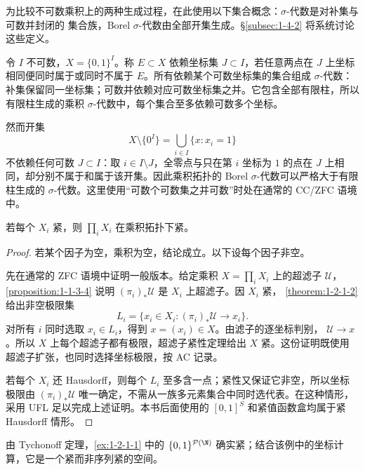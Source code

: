 \begin{remark}\label{rem:1-2-2-borel-cylinder}
为比较不可数乘积上的两种生成过程，在此使用以下集合概念：\(\sigma\)-代数是对补集与可数并封闭的
集合族，Borel \(\sigma\)-代数由全部开集生成。\S\ref{subsec:1-4-2} 将系统讨论这些定义。

令 \(I\) 不可数，\(X=\{0,1\}^{I}\)。称 \(E\subset X\) 依赖坐标集 \(J\subset I\)，若任意两点在
\(J\) 上坐标相同便同时属于或同时不属于 \(E\)。所有依赖某个可数坐标集的集合组成 \(\sigma\)-代数：
补集保留同一坐标集；可数并依赖对应可数坐标集之并。它包含全部有限柱，所以有限柱生成的乘积
\(\sigma\)-代数中，每个集合至多依赖可数多个坐标。

然而开集
\[
 X\setminus\{0^I\}=\bigcup_{i\in I}\{x:x_i=1\}
\]
不依赖任何可数 \(J\subset I\)：取 \(i\in I\setminus J\)，全零点与只在第 \(i\) 坐标为 \(1\) 的点在
\(J\) 上相同，却分别不属于和属于该开集。因此乘积拓扑的 Borel \(\sigma\)-代数可以严格大于有限柱生成的
\(\sigma\)-代数。这里使用“可数个可数集之并可数”时处在通常的 \textsf{CC}/ZFC 语境中。
\end{remark}

\begin{theorem}[Tychonoff 定理]\label{theorem:1-2-2-2}
若每个 \(X_i\) 紧，则 \(\prod_iX_i\) 在乘积拓扑下紧。
\end{theorem}
\begin{proof}
若某个因子为空，乘积为空，结论成立。以下设每个因子非空。

先在通常的 ZFC 语境中证明一般版本。给定乘积 \(X=\prod_iX_i\) 上的超滤子 \(\mathcal U\)，
\cref{proposition:1-1-3-4} 说明 \((\pi_i)_*\mathcal U\) 是 \(X_i\) 上超滤子。因 \(X_i\) 紧，
\cref{theorem:1-2-1-2} 给出非空极限集
\[
 L_i=\{x_i\in X_i:(\pi_i)_*\mathcal U\to x_i\}.
\]
对所有 \(i\) 同时选取 \(x_i\in L_i\)，得到 \(x=(x_i)\in X\)。由滤子的逐坐标判别，
\(\mathcal U\to x\)。所以 \(X\) 上每个超滤子都有极限，超滤子紧性定理给出 \(X\) 紧。这份证明既使用
超滤子扩张，也同时选择坐标极限，按 \textsf{AC} 记录。

若每个 \(X_i\) 还 Hausdorff，则每个 \(L_i\) 至多含一点；紧性又保证它非空，所以坐标极限由
\((\pi_i)_*\mathcal U\) 唯一确定，不需从一族多元素集合中同时选代表。在这种情形，采用
\textsf{UFL} 足以完成上述证明。本书后面使用的 \([0,1]^S\) 和紧值函数盒均属于紧 Hausdorff 情形。
\end{proof}

由 Tychonoff 定理，\cref{ex:1-2-1-1} 中的
\(\{0,1\}^{\mathcal P(\N)}\) 确实紧；结合该例中的坐标计算，它是一个紧而非序列紧的空间。

